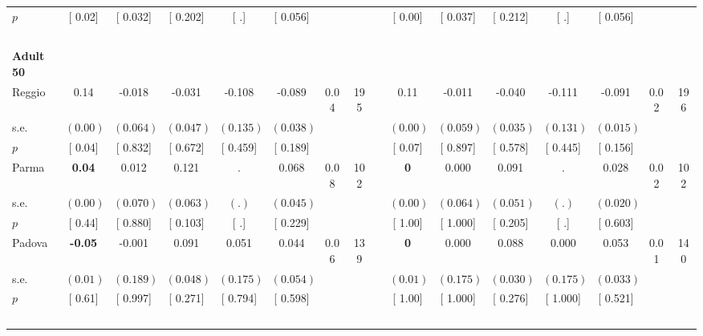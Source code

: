 \begin{longtable}{L{8em} c c c c c c c p{1em} c c c c c c c}
\quad \quad \quad \quad $ p$ & [     0.02] & [    0.032] & [    0.202] & [        .] & [    0.056] & & & & [     0.00] & [    0.037] & [    0.212] & [        .] & [    0.056] & &  \\[1em]
~\\[1em]
\quad \quad \textbf{Adult 50} & & & & & & & & & & & & & & & \\* 
\quad \quad \quad Reggio& 0.14 &    -0.018 &    -0.031 &    -0.108 &    -0.089 &      0.04 &       195 & & 0.11 &    -0.011 &    -0.040 &    -0.111 &    -0.091 &      0.02 &       196  \\*
\quad \quad \quad \quad s.e.& $ (     0.00)$ & $ (    0.064)$ & $ (    0.047)$ & $ (    0.135)$ & $ (    0.038)$ & & & & $ (     0.00)$ & $ (    0.059)$ & $ (    0.035)$ & $ (    0.131)$ & $ (    0.015)$ & &  \\*
\quad \quad \quad \quad $ p$ & [     0.04] & [    0.832] & [    0.672] & [    0.459] & [    0.189] & & & & [     0.07] & [    0.897] & [    0.578] & [    0.445] & [    0.156] & &  \\[1em]
\quad \quad \quad Parma& \textbf{     0.04} &     0.012 &     0.121 &         . &     0.068 &      0.08 &       102 & & \textbf{0} &     0.000 &     0.091 &         . &     0.028 &      0.02 &       102  \\*
\quad \quad \quad \quad s.e.& $ (     0.00)$ & $ (    0.070)$ & $ (    0.063)$ & $ (        .)$ & $ (    0.045)$ & & & & $ (     0.00)$ & $ (    0.064)$ & $ (    0.051)$ & $ (        .)$ & $ (    0.020)$ & &  \\*
\quad \quad \quad \quad $ p$ & [     0.44] & [    0.880] & [    0.103] & [        .] & [    0.229] & & & & [     1.00] & [    1.000] & [    0.205] & [        .] & [    0.603] & &  \\[1em]
\quad \quad \quad Padova& \textbf{    -0.05} &    -0.001 &     0.091 &     0.051 &     0.044 &      0.06 &       139 & & \textbf{0} &     0.000 &     0.088 &     0.000 &     0.053 &      0.01 &       140  \\*
\quad \quad \quad \quad s.e.& $ (     0.01)$ & $ (    0.189)$ & $ (    0.048)$ & $ (    0.175)$ & $ (    0.054)$ & & & & $ (     0.01)$ & $ (    0.175)$ & $ (    0.030)$ & $ (    0.175)$ & $ (    0.033)$ & &  \\*
\quad \quad \quad \quad $ p$ & [     0.61] & [    0.997] & [    0.271] & [    0.794] & [    0.598] & & & & [     1.00] & [    1.000] & [    0.276] & [    1.000] & [    0.521] & &  \\[1em]
~\\[1em]

\end{longtable}
